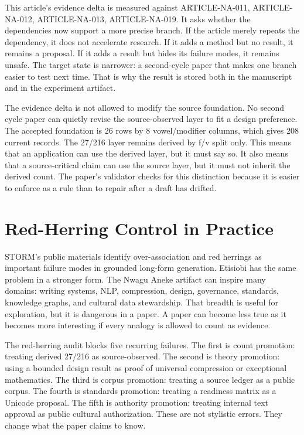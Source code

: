 \documentclass[sigconf,nonacm]{acmart}
\begin{document}
This article's evidence delta is measured against ARTICLE-NA-011, ARTICLE-NA-012, ARTICLE-NA-013, ARTICLE-NA-019. It asks whether the
dependencies now support a more precise branch. If the article merely repeats
the dependency, it does not accelerate research. If it adds a method but no
result, it remains a proposal. If it adds a result but hides its failure modes,
it remains unsafe. The target state is narrower: a second-cycle paper that makes
one branch easier to test next time. That is why the result is stored both in
the manuscript and in the experiment artifact.

The evidence delta is not allowed to modify the source foundation. No second
cycle paper can quietly revise the source-observed layer to fit a design
preference. The accepted foundation is 26 rows by 8 vowel/modifier columns,
which gives 208 current records. The 27/216 layer remains derived by f/v split
only. This means that an application can use the derived layer, but it must say
so. It also means that a source-critical claim can use the source layer, but it
must not inherit the derived count. The paper's validator checks for this
distinction because it is easier to enforce as a rule than to repair after a
draft has drifted.

\section{Red-Herring Control in Practice}
STORM's public materials identify over-association and red herrings as important
failure modes in grounded long-form generation. Etisiobi has the same problem in
a stronger form. The Nwagu Aneke artifact can inspire many domains: writing
systems, NLP, compression, design, governance, standards, knowledge graphs, and
cultural data stewardship. That breadth is useful for exploration, but it is
dangerous in a paper. A paper can become less true as it becomes more
interesting if every analogy is allowed to count as evidence.

The red-herring audit blocks five recurring failures. The first is count
promotion: treating derived 27/216 as source-observed. The second is theory
promotion: using a bounded design result as proof of universal compression or
exceptional mathematics. The third is corpus promotion: treating a source
ledger as a public corpus. The fourth is standards promotion: treating a
readiness matrix as a Unicode proposal. The fifth is authority promotion:
treating internal text approval as public cultural authorization. These are not
stylistic errors. They change what the paper claims to know.
\end{document}
